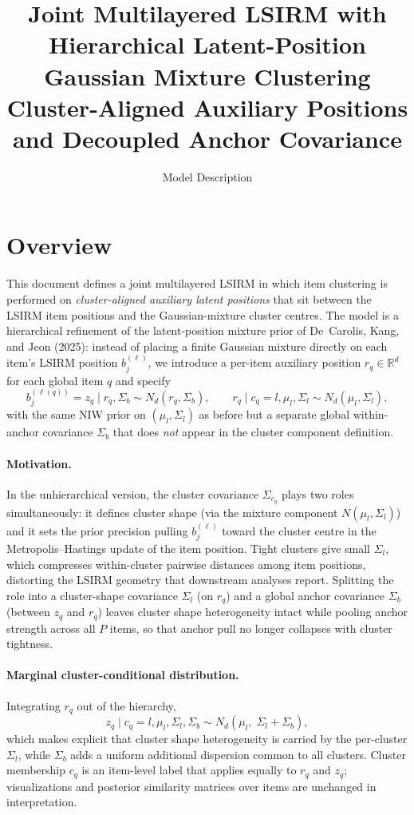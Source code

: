 \documentclass[11pt]{article}
\title{Joint Multilayered LSIRM with Hierarchical Latent-Position Gaussian Mixture Clustering\\
Cluster-Aligned Auxiliary Positions and Decoupled Anchor Covariance}
\date{Model Description}
\newcommand{\R}{\mathbb R}
\begin{document}
\maketitle

\section{Overview}

This document defines a joint multilayered LSIRM in which item clustering is
performed on \emph{cluster-aligned auxiliary latent positions} that sit
between the LSIRM item positions and the Gaussian-mixture cluster centres.
The model is a hierarchical refinement of the latent-position mixture prior
of De~Carolis, Kang, and Jeon (2025): instead of placing a finite Gaussian
mixture directly on each item's LSIRM position $b_j^{(\ell)}$, we introduce
a per-item auxiliary position $r_q\in\R^d$ for each global item $q$ and
specify
\[
    b_j^{(\ell(q))}=z_q\mid r_q,\Sigma_b\sim N_d(r_q,\Sigma_b),
    \qquad
    r_q\mid c_q=l,\mu_l,\Sigma_l\sim N_d(\mu_l,\Sigma_l),
\]
with the same NIW prior on $(\mu_l,\Sigma_l)$ as before but a separate global
within-anchor covariance $\Sigma_b$ that does \emph{not} appear in the cluster
component definition.

\paragraph{Motivation.}
In the unhierarchical version, the cluster covariance $\Sigma_{c_q}$ plays
two roles simultaneously: it defines cluster shape (via the mixture component
$N(\mu_l,\Sigma_l)$) and it sets the prior precision pulling $b_j^{(\ell)}$
toward the cluster centre in the Metropolis--Hastings update of the item
position.  Tight clusters give small $\Sigma_l$, which compresses
within-cluster pairwise distances among item positions, distorting the LSIRM
geometry that downstream analyses report.  Splitting the role into a
cluster-shape covariance $\Sigma_l$ (on $r_q$) and a global anchor
covariance $\Sigma_b$ (between $z_q$ and $r_q$) leaves cluster shape
heterogeneity intact while pooling anchor strength across all $P$ items, so
that anchor pull no longer collapses with cluster tightness.

\paragraph{Marginal cluster-conditional distribution.}
Integrating $r_q$ out of the hierarchy,
\begin{equation}
    z_q\mid c_q=l,\mu_l,\Sigma_l,\Sigma_b\sim N_d(\mu_l,\;\Sigma_l+\Sigma_b),
    \label{eq:z-marginal}
\end{equation}
which makes explicit that cluster shape heterogeneity is carried by the
per-cluster $\Sigma_l$, while $\Sigma_b$ adds a uniform additional dispersion
common to all clusters.  Cluster membership $c_q$ is an item-level label
that applies equally to $r_q$ and $z_q$; visualizations and posterior
similarity matrices over items are unchanged in interpretation.
\end{document}
